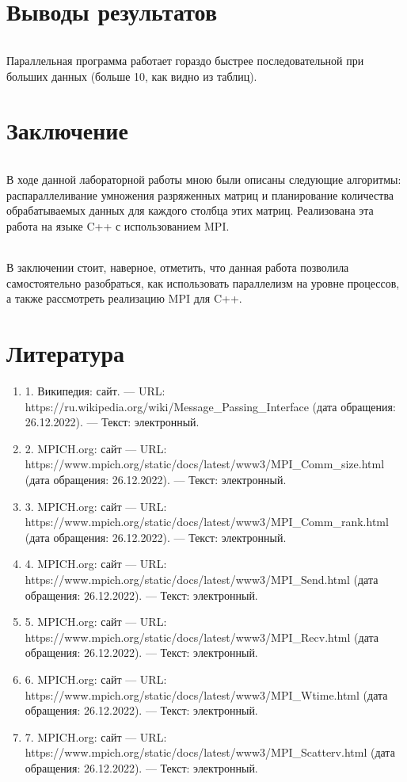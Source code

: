 \documentclass[12pt,a4paper]{article}
\begin{document}
\part*{Выводы результатов}
\paragraph{} Параллельная программа работает гораздо быстрее последовательной при больших данных (больше 10, как видно из таблиц). 

\part*{Заключение}
\paragraph{}В ходе данной лабораторной работы мною были описаны следующие алгоритмы: распараллеливание умножения разряженных матриц и планирование количества обрабатываемых данных для каждого столбца этих матриц. Реализована эта работа на языке C++ с использованием MPI.
\paragraph{}В заключении стоит, наверное, отметить, что данная работа позволила самостоятельно разобраться, как использовать параллелизм на уровне процессов, а также рассмотреть реализацию MPI для C++.

\part*{Литература}
\begin{enumerate} 
\item 1. Википедия: сайт. —  URL: https://ru.wikipedia.org/wiki/Message\_Passing\_Interface (дата обращения: 26.12.2022). —  Текст: электронный.
\item 2. MPICH.org: сайт —  URL: https://www.mpich.org/static/docs/latest/www3/MPI\_Comm\_size.html (дата обращения: 26.12.2022). —  Текст: электронный.
\item 3. MPICH.org: сайт —  URL: https://www.mpich.org/static/docs/latest/www3/MPI\_Comm\_rank.html (дата обращения: 26.12.2022). —  Текст: электронный.
\item 4. MPICH.org: сайт —  URL: https://www.mpich.org/static/docs/latest/www3/MPI\_Send.html (дата обращения: 26.12.2022). —  Текст: электронный.
\item 5. MPICH.org: сайт —  URL: https://www.mpich.org/static/docs/latest/www3/MPI\_Recv.html (дата обращения: 26.12.2022). —  Текст: электронный.
\item 6. MPICH.org: сайт —  URL: https://www.mpich.org/static/docs/latest/www3/MPI\_Wtime.html (дата обращения: 26.12.2022). —  Текст: электронный.
\item 7. MPICH.org: сайт —  URL: https://www.mpich.org/static/docs/latest/www3/MPI\_Scatterv.html (дата обращения: 26.12.2022). —  Текст: электронный.
\end{enumerate} 
\end{document}
